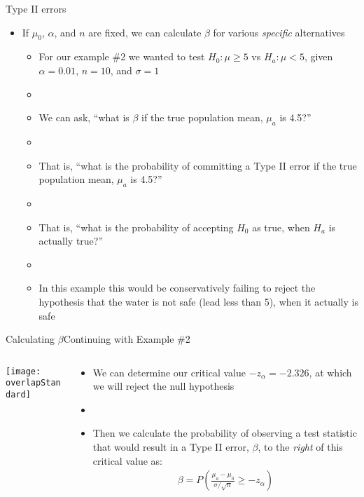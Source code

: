 \documentclass[xcolor=dvipsnames]{beamer}
\begin{document}
\begin{frame}{Type II errors}
	\begin{itemize}
		\item If $\mu_0$, $\alpha$, and $n$ are fixed, we can calculate $\beta$ for various \emph{specific} alternatives \pause
		\begin{itemize}
			\item For our example \#2 we wanted to test $H_0: \mu \geq 5$ vs $H_a: \mu < 5$, given $\alpha = 0.01$, $n = 10$, and $\sigma = 1$ \pause
			\item[]
			\item We can ask, ``what is $\beta$ if the true population mean, $\mu_a$ is 4.5?'' \pause
			\item[]
			\item That is, ``what is the probability of committing a Type II error if the true population mean, $\mu_a$ is 4.5?'' \pause
			\item[]
			\item That is, ``what is the probability of accepting $H_0$ as true, when $H_a$ is actually true?'' \pause
			\item[]
			\item In this example this would be conservatively failing to reject the hypothesis that the water is not safe (lead less than 5), when it actually is safe
		\end{itemize}
	\end{itemize}
\end{frame}

\begin{frame}{Calculating $\beta$}{Continuing with Example \#2}
\begin{columns}
	\begin{column}{.55 \textwidth}
		\begin{center}
			\texttt{[image: overlapStandard]}
		\end{center}
	\end{column}
		\begin{column}{.5 \textwidth}
		\begin{itemize}
			\item We can determine our critical value $-z_{\alpha}= -2.326$, at which we will reject the null hypothesis \pause
			
			\item[]
			
			\item Then we calculate the probability of observing a test statistic that would result in a Type II error, $\beta$, to the \emph{right} of this critical value as: \pause
			\begin{gather*}
			\beta = P \left(\frac{\mu_a - \mu_0}{\sigma / \sqrt{n}} \geq -z_{\alpha} \right)
			\end{gather*}
		\end{itemize}
	\end{column}
\end{columns}
\end{frame}
\end{document}

